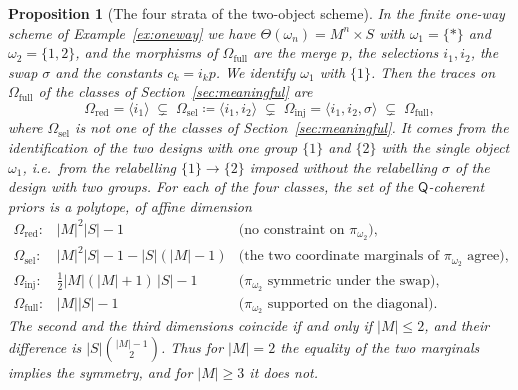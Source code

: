 \documentclass[11pt,a4paper]{article}
\theoremstyle{plain}
\newtheorem{proposition}[theorem]{Proposition}
\theoremstyle{definition}
\theoremstyle{remark}
\newcommand{\cat}[1]{\mathsf{#1}}
\newcommand{\catO}{\cat{\Omega}}
\begin{document}
\begin{proposition}[The four strata of the two-object scheme]\label{prop:priordim}
In the finite one-way scheme of Example~\ref{ex:oneway} we have
$\Theta(\omega_n) = M^{n}\times S$ with $\omega_1 = \{*\}$ and
$\omega_2 = \{1,2\}$, and the morphisms of $\catO_{\mathrm{full}}$ are the
merge $p$, the selections $i_1,i_2$, the swap $\sigma$ and the constants
$c_k = i_k p$. We identify $\omega_1$ with $\{1\}$. Then the traces on
$\catO_{\mathrm{full}}$ of the classes of Section~\ref{sec:meaningful} are
\[
\catO_{\mathrm{red}} = \langle i_1\rangle \;\subsetneq\;
\catO_{\mathrm{sel}} \coloneqq \langle i_1,i_2\rangle \;\subsetneq\;
\catO_{\mathrm{inj}} = \langle i_1,i_2,\sigma\rangle \;\subsetneq\;
\catO_{\mathrm{full}} ,
\]
where $\catO_{\mathrm{sel}}$ is not one of the classes of
Section~\ref{sec:meaningful}. It comes from the identification of the two
designs with one group $\{1\}$ and $\{2\}$ with the single object $\omega_1$,
i.e.\ from the relabelling $\{1\} \to \{2\}$ imposed without the relabelling
$\sigma$ of the design with two groups. For each of the four classes, the set of
the $\cat{Q}$-coherent priors is a polytope, of affine dimension
\[
\begin{array}{lll}
\catO_{\mathrm{red}}:  & |M|^{2}|S| - 1 & \text{(no constraint on $\pi_{\omega_2}$)},\\[2pt]
\catO_{\mathrm{sel}}:  & |M|^{2}|S| - 1 - |S|(|M|-1) & \text{(the two coordinate marginals of $\pi_{\omega_2}$ agree)},\\[2pt]
\catO_{\mathrm{inj}}:  & \tfrac12 |M|(|M|+1)\,|S| - 1 & \text{($\pi_{\omega_2}$ symmetric under the swap)},\\[2pt]
\catO_{\mathrm{full}}: & |M||S| - 1 & \text{($\pi_{\omega_2}$ supported on the diagonal)}.
\end{array}
\]
The second and the third dimensions coincide if and only if $|M| \le 2$, and
their difference is $|S|\binom{|M|-1}{2}$. Thus for $|M| = 2$ the equality of
the two marginals implies the symmetry, and for $|M| \ge 3$ it does not.
\end{proposition}
\end{document}

